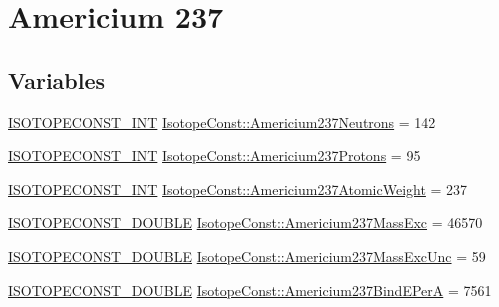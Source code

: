\hypertarget{group___isotope_const-_americium-_am237}{}\section{Americium 237}
\label{group___isotope_const-_americium-_am237}
\subsection*{Variables}
\begin{DoxyCompactItemize}
\item 
\mbox{\hyperlink{group___isotope_const-_macros_ga5f18360b3e99483a35c32d789e62621c}{I\+S\+O\+T\+O\+P\+E\+C\+O\+N\+S\+T\+\_\+\+I\+NT}} \mbox{\hyperlink{group___isotope_const-_americium-_am237_ga23c60d97dbecd926fa72e0f264c898b0}{Isotope\+Const\+::\+Americium237\+Neutrons}} = 142
\item 
\mbox{\hyperlink{group___isotope_const-_macros_ga5f18360b3e99483a35c32d789e62621c}{I\+S\+O\+T\+O\+P\+E\+C\+O\+N\+S\+T\+\_\+\+I\+NT}} \mbox{\hyperlink{group___isotope_const-_americium-_am237_ga6b477350f35d954eca255e08667a5371}{Isotope\+Const\+::\+Americium237\+Protons}} = 95
\item 
\mbox{\hyperlink{group___isotope_const-_macros_ga5f18360b3e99483a35c32d789e62621c}{I\+S\+O\+T\+O\+P\+E\+C\+O\+N\+S\+T\+\_\+\+I\+NT}} \mbox{\hyperlink{group___isotope_const-_americium-_am237_ga9adf6486929f7d48353cfe5574123081}{Isotope\+Const\+::\+Americium237\+Atomic\+Weight}} = 237
\item 
\mbox{\hyperlink{group___isotope_const-_macros_ga8f45a7272ce02c0b4c65c44636ed719a}{I\+S\+O\+T\+O\+P\+E\+C\+O\+N\+S\+T\+\_\+\+D\+O\+U\+B\+LE}} \mbox{\hyperlink{group___isotope_const-_americium-_am237_ga128beaf10bf3acd423ff7ee06e38d603}{Isotope\+Const\+::\+Americium237\+Mass\+Exc}} = 46570
\item 
\mbox{\hyperlink{group___isotope_const-_macros_ga8f45a7272ce02c0b4c65c44636ed719a}{I\+S\+O\+T\+O\+P\+E\+C\+O\+N\+S\+T\+\_\+\+D\+O\+U\+B\+LE}} \mbox{\hyperlink{group___isotope_const-_americium-_am237_ga9f5872af2018e62d87a93e4bd0405e9e}{Isotope\+Const\+::\+Americium237\+Mass\+Exc\+Unc}} = 59
\item 
\mbox{\hyperlink{group___isotope_const-_macros_ga8f45a7272ce02c0b4c65c44636ed719a}{I\+S\+O\+T\+O\+P\+E\+C\+O\+N\+S\+T\+\_\+\+D\+O\+U\+B\+LE}} \mbox{\hyperlink{group___isotope_const-_americium-_am237_gab071f740d50faf4e53060b875ae22001}{Isotope\+Const\+::\+Americium237\+Bind\+E\+PerA}} = 7561
\item 

\end{DoxyCompactItemize}
